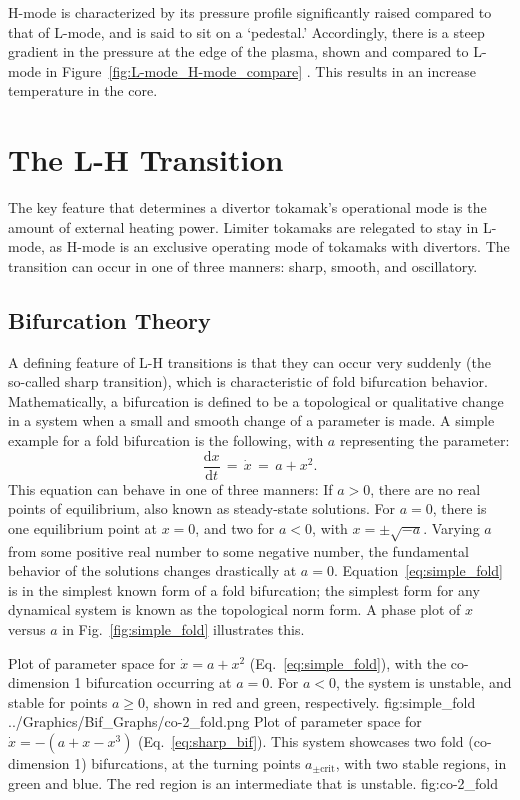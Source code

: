 H-mode is characterized by its pressure profile significantly raised compared to that of L-mode, and is said to sit on a `pedestal.'
Accordingly, there is a steep gradient in the pressure at the edge of the plasma, shown and compared to L-mode in Figure~\ref{fig:L-mode_H-mode_compare} \cite{weymiens_bifurcation_2014}.
This results in an increase temperature in the core.

\section{The L-H Transition}
The key feature that determines a divertor tokamak's operational mode is the amount of external heating power.
Limiter tokamaks are relegated to stay in L-mode, as H-mode is an exclusive operating mode of tokamaks with divertors.
The transition can occur in one of three manners: sharp, smooth, and oscillatory.

\subsection{Bifurcation Theory}
A defining feature of L-H transitions is that they can occur very suddenly (the so-called sharp transition), which is characteristic of fold bifurcation behavior.
Mathematically, a bifurcation is defined to be a topological or qualitative change in a system when a small and smooth change of a parameter is made.
A simple example for a fold bifurcation is the following, with $a$ representing the parameter:
\begin{equation}
	\frac{\text{d}x}{\text{d}t} \,=\, \dot{x} \,=\, a + x^2.
	\label{eq:simple_fold}
\end{equation}
This equation can behave in one of three manners:
If $a > 0$, there are no real points of equilibrium, also known as steady-state solutions.
For $a = 0$, there is one equilibrium point at $x = 0$, and two for $a < 0$, with $x = \pm\sqrt{-a}$.
Varying $a$ from some positive real number to some negative number, the fundamental behavior of the solutions changes drastically at $a = 0$.
Equation~\ref{eq:simple_fold} is in the simplest known form of a fold bifurcation; the simplest form for any dynamical system is known as the topological norm form.
A phase plot of $x$ versus $a$ in Fig.~\ref{fig:simple_fold} illustrates this.

	{Plot of parameter space for $\dot{x} = a + x^2$ (Eq.~\ref{eq:simple_fold}), with the co-dimension 1 bifurcation occurring at $a = 0$. %
	For $a < 0$, the system is unstable, and stable for points $a \geq 0$, shown in red and green, respectively.}
	{fig:simple_fold}
	{../Graphics/Bif_Graphs/co-2_fold.png}
	{Plot of parameter space for $\dot{x} = -(a + x - x^3)$ (Eq.~\ref{eq:sharp_bif}). %
	This system showcases two fold (co-dimension 1) bifurcations, at the turning points $a_{\pm\text{crit}}$, with two stable regions, in green and blue. %
	The red region is an intermediate that is unstable.}
	{fig:co-2_fold}

